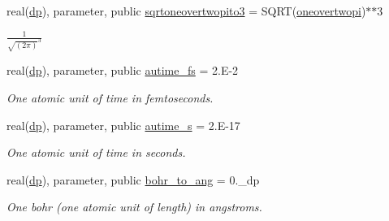 \begin{DoxyCompactItemize}
real(\mbox{\hyperlink{namespaceconstants__pop_aa40e688cf9ef9b7cf0db05c80879ca15}{dp}}), parameter, public \mbox{\hyperlink{namespaceconstants__pop_a48d520b0575fa59982719ff96fb7fda9}{sqrtoneovertwopito3}} = S\+Q\+RT(\mbox{\hyperlink{namespaceconstants__pop_ac19ec58d8898ca8e5b8643eb5392e6de}{oneovertwopi}})$\ast$$\ast$3
\begin{DoxyCompactList}\small\item\em $\frac{1}{\sqrt{(2\pi)}^3}$ \end{DoxyCompactList}\item 
\mbox{\label{namespaceconstants__pop_a88ee88acbcb1bf0469dc8669a50e6c91}} 
real(\mbox{\hyperlink{namespaceconstants__pop_aa40e688cf9ef9b7cf0db05c80879ca15}{dp}}), parameter, public \mbox{\hyperlink{namespaceconstants__pop_a88ee88acbcb1bf0469dc8669a50e6c91}{autime\+\_\+fs}} = 2.\+E-\/2
\begin{DoxyCompactList}\small\item\em One atomic unit of time in femtoseconds. \end{DoxyCompactList}\item 
\mbox{\label{namespaceconstants__pop_aeb96f2e5640ee234baacf3c6ccacdc6e}} 
real(\mbox{\hyperlink{namespaceconstants__pop_aa40e688cf9ef9b7cf0db05c80879ca15}{dp}}), parameter, public \mbox{\hyperlink{namespaceconstants__pop_aeb96f2e5640ee234baacf3c6ccacdc6e}{autime\+\_\+s}} = 2.\+E-\/17
\begin{DoxyCompactList}\small\item\em One atomic unit of time in seconds. \end{DoxyCompactList}\item 
\mbox{\label{namespaceconstants__pop_a75f02cb937876c56f22093c7578047df}} 
real(\mbox{\hyperlink{namespaceconstants__pop_aa40e688cf9ef9b7cf0db05c80879ca15}{dp}}), parameter, public \mbox{\hyperlink{namespaceconstants__pop_a75f02cb937876c56f22093c7578047df}{bohr\+\_\+to\+\_\+ang}} = 0.\+\_\+dp
\begin{DoxyCompactList}\small\item\em One bohr (one atomic unit of length) in angstroms. \end{DoxyCompactList}\item 
\mbox{\label{namespaceconstants__pop_a34e4163a044a3f01fe513adea2ccac34}} 
$$
\end{DoxyCompactItemize}
